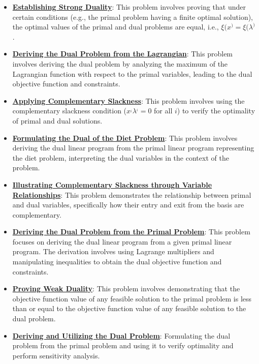\documentclass{article}%
\begin{document}
\begin{itemize}[leftmargin=*]
\item \href{https://www.math.purdue.edu/~yipn/421//2024-09-17-DualityGeneral.pdf#page=17}{\textbf{Establishing Strong Duality}}: This problem involves proving that under certain conditions (e.g., the primal problem having a finite optimal solution), the optimal values of the primal and dual problems are equal, i.e., $\xi(x^) = \xi(\lambda^)$.%
\item \href{https://www.math.purdue.edu/~yipn/421//2024-09-17-DualityGeneral.pdf#page=15}{\textbf{Deriving the Dual Problem from the Lagrangian}}: This problem involves deriving the dual problem by analyzing the maximum of the Lagrangian function with respect to the primal variables, leading to the dual objective function and constraints.%
\item \href{https://www.math.purdue.edu/~yipn/421//2024-09-17-DualityGeneral.pdf#page=22}{\textbf{Applying Complementary Slackness}}: This problem involves using the complementary slackness condition ($x^_i \lambda^_i = 0$ for all $i$) to verify the optimality of primal and dual solutions.%
\item \href{https://www.math.purdue.edu/~yipn/421//2024-09-19-DualityExamples.pdf#page=8}{\textbf{Formulating the Dual of the Diet Problem}}: This problem involves deriving the dual linear program from the primal linear program representing the diet problem, interpreting the dual variables in the context of the problem.%
\item \href{https://www.math.purdue.edu/~yipn/421//2024-09-24-SimplexMatrix.pdf#page=14}{\textbf{Illustrating Complementary Slackness through Variable Relationships}}: This problem demonstrates the relationship between primal and dual variables, specifically how their entry and exit from the basis are complementary.%
\item \href{https://www.math.purdue.edu/~yipn/421//2024-10-01-DualGeneralLP.pdf#page=1}{\textbf{Deriving the Dual Problem from the Primal Problem}}: This problem focuses on deriving the dual linear program from a given primal linear program.  The derivation involves using Lagrange multipliers and manipulating inequalities to obtain the dual objective function and constraints.%
\item \href{https://www.math.purdue.edu/~yipn/421//2024-10-01-DualGeneralLP.pdf#page=5}{\textbf{Proving Weak Duality}}: This problem involves demonstrating that the objective function value of any feasible solution to the primal problem is less than or equal to the objective function value of any feasible solution to the dual problem.%
\item \href{https://www.math.purdue.edu/~yipn/421//2024-10-01-SensitivityDuality.pdf#page=2}{\textbf{Deriving and Utilizing the Dual Problem}}: Formulating the dual problem from the primal problem and using it to verify optimality and perform sensitivity analysis.%
\end{itemize}
\end{document}
